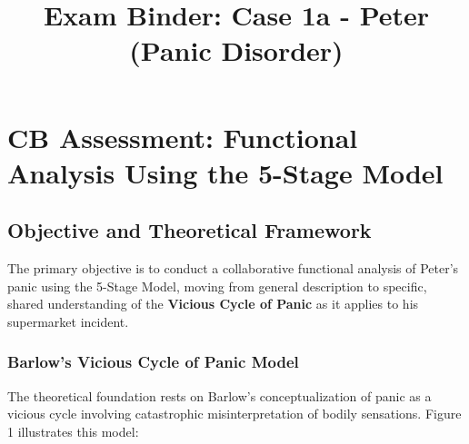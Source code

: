 \documentclass[
  american,
  letterpaper,
  DIV=11,
  numbers=noendperiod]{scrartcl}
\title{Exam Binder: Case 1a - Peter (Panic Disorder)}
\author{}
\date{}
\begin{document}
\maketitle


\newpage

\section{CB Assessment: Functional Analysis Using the 5-Stage
Model}\label{cb-assessment-functional-analysis-using-the-5-stage-model}

\subsection{Objective and Theoretical
Framework}\label{objective-and-theoretical-framework}

The primary objective is to conduct a collaborative functional analysis
of Peter's panic using the 5-Stage Model, moving from general
description to specific, shared understanding of the \textbf{Vicious
Cycle of Panic} as it applies to his supermarket incident.

\subsubsection{Barlow's Vicious Cycle of Panic
Model}\label{barlows-vicious-cycle-of-panic-model}

The theoretical foundation rests on Barlow's conceptualization of panic
as a vicious cycle involving catastrophic misinterpretation of bodily
sensations. Figure 1 illustrates this model:
\end{document}

